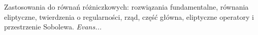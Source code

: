 Zastosowania do równań różniczkowych:  rozwiązania fundamentalne, równania eliptyczne, twierdzenia o regularności, rząd, część główna, eliptyczne operatory i przestrzenie Sobolewa. \hfill \emph{Evans...}